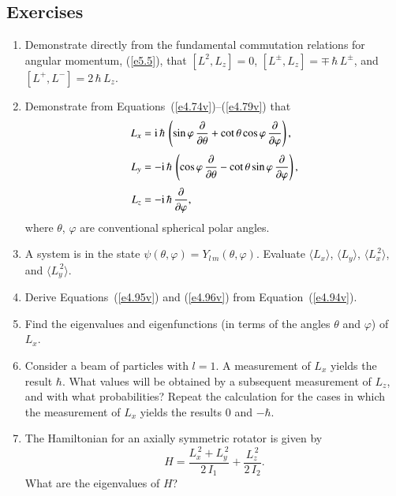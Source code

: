 \subsection*{Exercises}
\begin{enumerate}[label=\thechapter.\arabic*,leftmargin=*,widest=9.20]
\item Demonstrate directly from the fundamental commutation relations for angular momentum, (\ref{e5.5}),  that
$[L^2, L_z] = 0$, $[L^\pm, L_z] = \mp \,\hbar\,L^\pm$, and 
$[L^+,L^-] = 2\,\hbar\,L_z$.

\item Demonstrate from Equations~(\ref{e4.74v})--(\ref{e4.79v}) that 
\begin{align}
L_x &= {\rm i}\,\hbar\,\left(\sin\varphi\, \frac{\partial}{\partial \theta}
+ \cot\theta \cos\varphi\,\frac{\partial}{\partial \varphi}\right),\nonumber
\\[0.5ex]
L_y &= -{\rm i} \,\hbar\,\left(\cos\varphi\, \frac{\partial}{\partial\theta}
-\cot\theta \sin\varphi \,\frac{\partial}{\partial \varphi}\right),\nonumber\\[0.5ex]
L_z&= -{\rm i}\,\hbar\,\frac{\partial}{\partial\varphi},\nonumber
\end{align}
where $\theta$, $\varphi$ are conventional spherical polar angles. 

\item A system is in the state $\psi(\theta,\varphi)=Y_{l\,m}(\theta,\varphi)$. Evaluate
$\langle L_x\rangle$,  $\langle L_y\rangle$, $\langle L_x^{\,2}\rangle$, and 
$\langle L_y^{\,2}\rangle$.

\item Derive Equations~(\ref{e4.95v}) and (\ref{e4.96v}) from Equation~(\ref{e4.94v}).

\item Find the eigenvalues and eigenfunctions (in terms of the angles $\theta$ and $\varphi$) of $L_x$.

\item Consider a beam of particles with $l=1$. A measurement of $L_x$ yields the result $\hbar$. What
values will be obtained by a subsequent measurement of $L_z$, and with what probabilities? Repeat
the calculation for the cases in which the measurement of $L_x$ yields the results $0$ and
$-\hbar$. 

\item The Hamiltonian for an axially symmetric rotator is given by
$$
H = \frac{L_x^{\,2}+L_y^{\,2}}{2\,I_1} + \frac{L_z^{\,2}}{2\,I_2}.
$$
What are the eigenvalues of $H$?


\end{enumerate}
